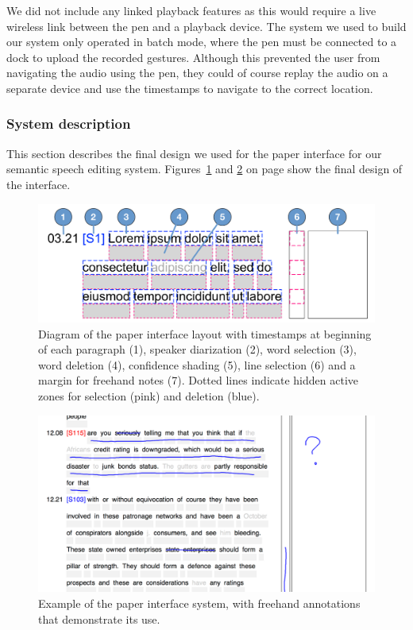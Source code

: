 We did not include any linked playback features as this would require a live wireless link between the pen and a
playback device. The system we used to build our system only operated in batch mode, where the pen must be
connected to a dock to upload the recorded gestures. Although this prevented the user from navigating the audio using
the pen, they could of course replay the audio on a separate device and use the timestamps to navigate to the correct
location.

\subsubsection{System description}

This section describes the final design we used for the paper interface for our semantic speech editing system.
Figures~\ref{fig:paper-interface-diagram} and \ref{fig:paper-interface-example} on page
\pageref{fig:paper-interface-diagram} show the final design of the interface.

\begin{figure}[p]
  \centering
  \includegraphics[width=\columnwidth]{figs/paper-interface-diagram.pdf}
  \caption{Diagram of the paper interface layout with timestamps at beginning of each paragraph (1), speaker
    diarization (2), word selection (3), word deletion (4), confidence shading (5), line selection (6) and a margin for
  freehand notes (7). Dotted lines indicate hidden active zones for selection (pink) and deletion (blue).}
  \label{fig:paper-interface-diagram}
\end{figure}

\begin{figure}[p]
  \centering
  \includegraphics[width=\columnwidth]{figs/paper-interface-example-annotations.png}
  \caption{Example of the paper interface system, with freehand annotations that demonstrate its use.}
  \label{fig:paper-interface-example}
\end{figure}

